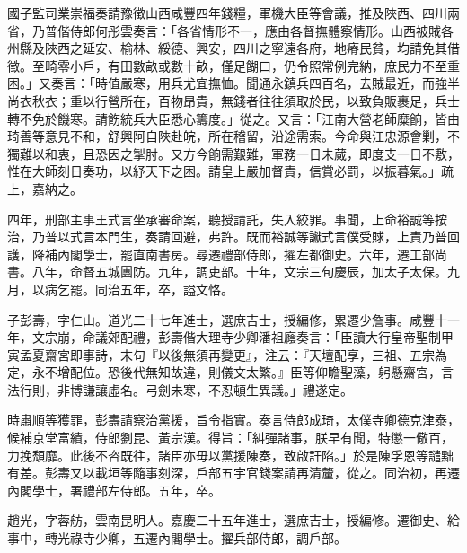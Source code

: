 \begin{pinyinscope}
國子監司業崇福奏請豫徵山西咸豐四年錢糧，軍機大臣等會議，推及陜西、四川兩省，乃普偕侍郎何彤雲奏言：「各省情形不一，應由各督撫體察情形。山西被賊各州縣及陜西之延安、榆林、綏德、興安，四川之寧遠各府，地瘠民貧，均請免其借徵。至畸零小戶，有田數畝或數十畝，僅足餬口，仍令照常例完納，庶民力不至重困。」又奏言：「時值嚴寒，用兵尤宜撫恤。聞通永鎮兵四百名，去賊最近，而強半尚衣秋衣；重以行營所在，百物昂貴，無錢者往往須取於民，以致負販裹足，兵士轉不免於饑寒。請飭統兵大臣悉心籌度。」從之。又言：「江南大營老師糜餉，皆由琦善等意見不和，舒興阿自陜赴皖，所在稽留，沿途需索。今命與江忠源會剿，不獨難以和衷，且恐因之掣肘。又方今餉需艱難，軍務一日未蕆，即度支一日不敷，惟在大師刻日奏功，以紓天下之困。請皇上嚴加督責，信賞必罰，以振暮氣。」疏上，嘉納之。

四年，刑部主事王式言坐承審命案，聽授請託，失入絞罪。事聞，上命裕誠等按治，乃普以式言本門生，奏請回避，弗許。既而裕誠等讞式言僕受賕，上責乃普回護，降補內閣學士，罷直南書房。尋遷禮部侍郎，擢左都御史。六年，遷工部尚書。八年，命督五城團防。九年，調吏部。十年，文宗三旬慶辰，加太子太保。九月，以病乞罷。同治五年，卒，謚文恪。

子彭壽，字仁山。道光二十七年進士，選庶吉士，授編修，累遷少詹事。咸豐十一年，文宗崩，命議郊配禮，彭壽偕大理寺少卿潘祖廕奏言：「臣讀大行皇帝聖制甲寅孟夏齋宮即事詩，末句『以後無須再變更』，注云：『天壇配享，三祖、五宗為定，永不增配位。恐後代無知故違，則儀文太繁。』臣等仰瞻聖藻，躬懸齋宮，言法行則，非博謙讓虛名。弓劍未寒，不忍頓生異議。」禮遂定。

時肅順等獲罪，彭壽請察治黨援，旨令指實。奏言侍郎成琦，太僕寺卿德克津泰，候補京堂富績，侍郎劉昆、黃宗漢。得旨：「糾彈諸事，朕早有聞，特懲一儆百，力挽頹靡。此後不咨既往，諸臣亦毋以黨援陳奏，致啟訐陷。」於是陳孚恩等譴黜有差。彭壽又以載垣等隨事刻深，戶部五宇官錢案請再清釐，從之。同治初，再遷內閣學士，署禮部左侍郎。五年，卒。

趙光，字蓉舫，雲南昆明人。嘉慶二十五年進士，選庶吉士，授編修。遷御史、給事中，轉光祿寺少卿，五遷內閣學士。擢兵部侍郎，調戶部。


\end{pinyinscope}

